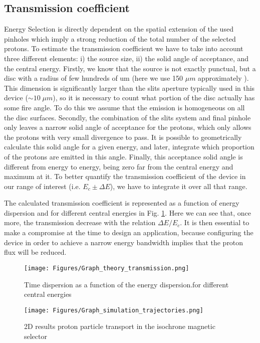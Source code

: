 \documentclass{cup-hpl}
\begin{document}
\subsection{Transmission coefficient}
Energy Selection is directly dependent on the spatial extension of the used pinholes which imply a strong reduction of the total number of the selected protons. To estimate the transmission coefficient we have to take into account three different elements: i) the source size, ii) the solid angle of acceptance, and the central energy. Firstly, we know that the source is not exactly punctual, but a disc with a radius of few hundreds of um (here we use 150 $\mu m$ approximately \cite{Mal22}). This dimension is significantly larger than the slits aperture typically used in this device ($\sim 10 \; \mu m$), so it is necessary to count what portion of the disc actually has some fire angle. To do this we assume that the emission is homogeneous on all the disc surfaces. Secondly, the combination of the slits system and final pinhole only leaves a narrow solid angle of acceptance for the protons, which only allows the protons with very small divergence to pass. It is possible to geometrically calculate this solid angle for a given energy, and later, integrate which proportion of the protons are emitted in this angle. Finally, this acceptance solid angle is different from energy to energy, being zero far from the central energy and maximum at it. To better quantify the transmission coefficient of the device in our range of interest (i.e. $E_c \pm \Delta E$), we have to integrate it over all that range.

The calculated transmission coefficient is represented as a function of energy dispersion and for different central energies in Fig. \ref{Graphs theory transmission}. Here we can see that, once more, the transmission decrease with the relation $\Delta E / E_c$. It is then essential to make a compromise at the time to design an application, because configuring the device in order to achieve a narrow energy bandwidth implies that the proton flux will be reduced. 


\begin{figure}[t]
	\centering
		\texttt{[image: Figures/Graph\_theory\_transmission.png]}%
	\caption{Time dispersion as a function of the  energy dispersion.for different central energies}
\label{Graphs theory transmission}
\end{figure}



\begin{figure}[t]
	\centering
		\texttt{[image: Figures/Graph\_simulation\_trajectories.png]}%
	\caption{2D results proton particle transport in the isochrone magnetic selector }
\label{Graph simulation trajectories}
\end{figure}
\end{document}
